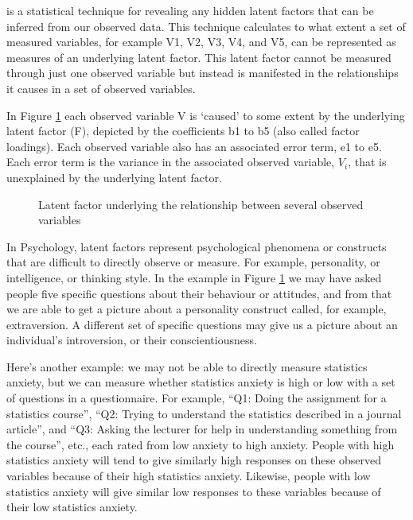  is a statistical technique for revealing any hidden latent factors that can be inferred from our observed data. This technique calculates to what extent a set of measured variables, for example V1, V2, V3, V4, and V5, can be represented as measures of an underlying latent factor. This latent factor cannot be measured through just one observed variable but instead is manifested in the relationships it causes in a set of observed variables. 

In Figure \ref{fig:fa1} each observed variable V is `caused’ to some extent by the underlying latent factor (F), depicted by the coefficients b1 to b5 (also called factor loadings). Each observed variable also has an associated error term, e1 to e5. Each error term is the variance in the associated observed variable, $V_i$, that is unexplained by the underlying latent factor.

\begin{figure}[!htb]
\begin{center}
\caption{Latent factor underlying the relationship between several observed variables}
\label{fig:fa1}
\HR
\end{center}
\end{figure}

In Psychology, latent factors represent psychological phenomena or constructs that are difficult to directly observe or measure. For example, personality, or intelligence, or thinking style. In the example in Figure \ref{fig:fa1} we may have asked people five specific questions about their behaviour or attitudes, and from that we are able to get a picture about a personality construct called, for example, extraversion. A different set of specific questions may give us a picture about an individual’s introversion, or their conscientiousness. 

Here’s another example: we may not be able to directly measure statistics anxiety, but we can measure whether statistics anxiety is high or low with a set of questions in a questionnaire. For example, “Q1: Doing the assignment for a statistics course”, “Q2: Trying to understand the statistics described in a journal article”, and “Q3: Asking the lecturer for help in understanding something from the course”, etc., each rated from low anxiety to high anxiety. People with high statistics anxiety will tend to give similarly high responses on these observed variables because of their high statistics anxiety. Likewise, people with low statistics anxiety will give similar low responses to these variables because of their low statistics anxiety. 

